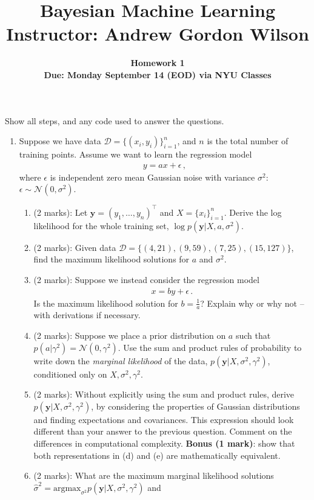 \documentclass[11pt]{article}
\title{\vspace{-20mm} Bayesian Machine Learning \\ \vspace{5mm}  \normalsize Instructor: Andrew Gordon Wilson}
\date{}
\author{
\textbf{Homework 1} \\ \textbf{Due: Monday September 14 (EOD) via NYU Classes} }
\newcommand{\mbf}[1]{{\boldsymbol{\mathbf{#1}}}}
\renewcommand{\bm}{\mbf}
\begin{document}
\maketitle

Show all steps, and any code used to answer the questions.

\begin{enumerate}
\item Suppose we have data $\mathcal{D} = \{(x_i, y_i)\}_{i=1}^{n}$, and $n$ is the total number
of training points.  Assume we want to learn the regression model
\begin{align}
y = a x  + \epsilon \,,  \label{eqn: first}
\end{align}
where $\epsilon$ is independent zero mean Gaussian noise with variance $\sigma^2$: 
$\epsilon \sim \mathcal{N}(0,\sigma^2)$.
\begin{enumerate}[label=(\alph*)]
\item (2 marks): Let $\bm{y} = (y_1,\dots,y_n)^{\top}$ and $X = \{x_i\}_{i=1}^{n}$.  Derive the 
log likelihood for the whole training set, $\log p(\bm{y} | X, a, \sigma^2)$.
\item (2 marks): Given data $\mathcal{D} = \{(4,21), (9,59), (7,25), (15,127)\}$, find the maximum
likelihood solutions for $a$ and $\sigma^2$.
\item (2 marks): Suppose we instead consider the regression model 
\begin{align}
x = b y + \epsilon \,.
\end{align}
Is the maximum likelihood solution for $b = \frac{1}{a}$?  Explain why or why not -- with derivations if necessary.
\item (2 marks): Suppose we place a prior distribution on $a$ such that $p(a | \gamma^2) = \mathcal{N}(0,\gamma^2)$.  Use
the sum and product rules of probability to write down the \emph{marginal likelihood} of the data, 
$p(\bm{y} | X, \sigma^2, \gamma^2)$, conditioned only on $X, \sigma^2, \gamma^2$.  
\item (2 marks): Without explicitly using the sum and product rules, derive $p(\bm{y} | X, \sigma^2, \gamma^2)$, by considering 
the properties of Gaussian distributions and finding expectations and covariances.  This expression should look different
than your answer to the previous question.  Comment on the differences in computational complexity.  \textbf{Bonus (1 mark)}:
show that both representations in (d) and (e) are mathematically equivalent.
\item (2 marks): What are the maximum marginal likelihood solutions $\hat{\sigma}^2 =  \text{argmax}_{\sigma^2} p(\bm{y} | X, \sigma^2, \gamma^2)$ and 

\end{enumerate}
\end{enumerate}
\end{document}

